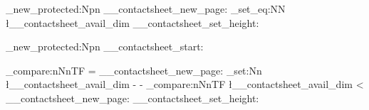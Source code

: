 \cs_new_protected:Npn \__contactsheet_new_page:
    {
        \clearpage
        \thispagestyle{empty}
        \dim_set_eq:NN \l__contactsheet_avail_dim \textheight
        \__contactsheet_set_height:
        \vspace*{\fill}
        \noindent
    }

\cs_new_protected:Npn \__contactsheet_start:
    {
        \par
        \dim_compare:nNnTF { \pagegoal } = { \maxdimen }
            { \__contactsheet_new_page: }                       %
            {
                \dim_set:Nn \l__contactsheet_avail_dim
                    { \pagegoal - \pagetotal - \pagedepth }
                \dim_compare:nNnTF
                    { \l__contactsheet_avail_dim }
                    < { \contactsheetminfraction \textheight }
                    { \__contactsheet_new_page: }               %
                    {
                        \__contactsheet_set_height:
                        \noindent
                    }
            }
    }

